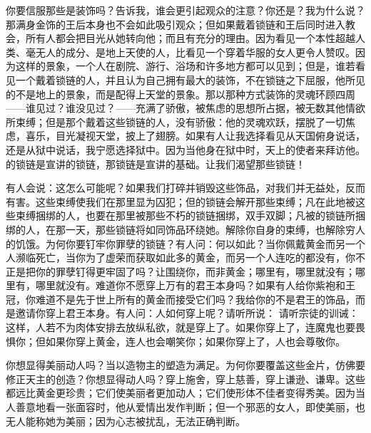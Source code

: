 你要信服那些是装饰吗？告诉我，谁会更引起观众的注意？你还是？我为什么说？那满身金饰的王后本身也不会如此吸引观众；但如果戴着锁链和王后同时进入教会，所有人都会把目光从她转向他；而且有充分的理由。因为看见一个本性超越人类、毫无人的成分、是地上天使的人，比看见一个穿着华服的女人更令人赞叹。因为这样的景象，一个人在剧院、游行、浴场和许多地方都可以见到；但是，谁若看见一个戴着锁链的人，并且认为自己拥有最大的装饰，不在锁链之下屈服，他所见的不是地上的景象，而是配得上天堂的景象。那以那种方式装饰的灵魂环顾四周——谁见过？谁没见过？——充满了骄傲，被焦虑的思想所占据，被无数其他情欲所束缚；但是那个戴着这些锁链的人，没有骄傲：他的灵魂欢跃，摆脱了一切焦虑，喜乐，目光凝视天堂，披上了翅膀。如果有人让我选择看见从天国俯身说话，还是从狱中说话，我宁愿选择狱中。因为当他身在狱中时，天上的使者来拜访他。的锁链是宣讲的锁链，那锁链是宣讲的基础。让我们渴望那些锁链！\par

有人会说：这怎么可能呢？如果我们打碎并销毁这些饰品，对我们并无益处，反而有害。这些束缚使我们在那里显为囚犯；但的锁链会解开那些束缚；凡在此地被这些束缚捆绑的人，也要在那里被那些不朽的锁链捆绑，双手双脚；凡被的锁链所捆绑的人，在那一天，那些锁链将如同饰品环绕她。解除你自身的束缚，也解除穷人的饥饿。为何你要钉牢你罪孽的锁链？有人问：何以如此？当你佩戴黄金而另一个人濒临死亡，当你为了虚荣而获取如此多的黄金，而另一个人连吃的都没有，你不正是把你的罪孽钉得更牢固了吗？让围绕你，而非黄金；哪里有，哪里就没有；哪里有，哪里就没有。难道你不愿穿上万有的君王本身吗？如果有人给你紫袍和王冠，你难道不是先于世上所有的黄金而接受它们吗？我给你的不是君王的饰品，而是邀请你穿上君王本身。有人问：人如何穿上呢？请听所说： 请听宗徒的训诫： 这样，人若不为肉体安排去放纵私欲，就是穿上了。如果你穿上了，连魔鬼也要畏惧你；但如果你穿上黄金，连人也会嘲笑你；如果你穿上了，人也会尊敬你。\par

你想显得美丽动人吗？当以造物主的塑造为满足。为何你要覆盖这些金片，仿佛要修正天主的创造？你想显得动人吗？穿上施舍，穿上慈善，穿上谦逊、谦卑。这些都远比黄金更珍贵；它们使美丽者更加动人；它们使形体不佳者变得秀美。因为当人善意地看一张面容时，他从爱情出发作判断；但一个邪恶的女人，即使美丽，也无人能称她为美丽；因为心志被扰乱，无法正确判断。\par

